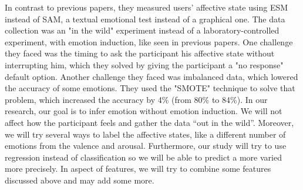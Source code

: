 \documentclass[../main.tex]{subfiles}
\begin{document}
In contrast to previous papers, they measured users' affective state using ESM instead of SAM, 
a textual emotional test instead of a graphical one. The data collection was an "in the wild" 
experiment instead of a laboratory-controlled experiment, with emotion induction, like seen in 
previous papers. One challenge they faced was the timing to ask the participant his affective 
state without interrupting him, which they solved by giving the participant a "no response" 
default option. Another challenge they faced was imbalanced data, which lowered the accuracy of 
some emotions. They used the "SMOTE" technique to solve that problem, which increased the 
accuracy by 4\% (from 80\% to 84\%).
In our research, our goal is to infer emotion without emotion induction. We will not affect how the participant feels and gather the data “out in the wild”. Moreover, we will try several ways to label the affective states, like a different number of emotions from the valence and arousal. Furthermore, our study will try to use regression instead of classification so we will be able to predict a more varied  more precisely. In aspect of features, we will try to combine some features discussed above and may add some more.
\end{document}
